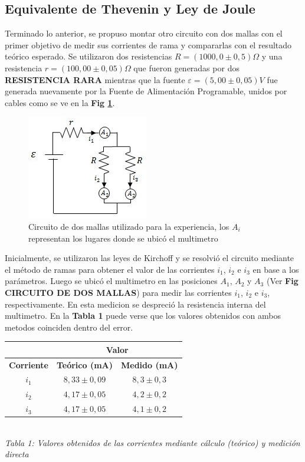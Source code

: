 \documentclass[11pt,a4paper]{article}
\begin{document}
\subsection{Equivalente de Thevenin y Ley de Joule}

Terminado lo anterior, se propuso montar otro circuito con dos mallas con el primer objetivo de medir sus corrientes de rama y compararlas con el resultado teórico esperado. Se utilizaron dos resistencias $R = (1000,0\pm0,5)\Omega$ y una resistencia $r = (100,00\pm0,05)\Omega$ que fueron generadas por dos \textbf{RESISTENCIA RARA} mientras que la fuente $\varepsilon = (5,00\pm0,05)V$ fue generada nuevamente por la Fuente de Alimentación Programable, unidos por cables como se ve en la \textbf{Fig \ref{fig:circ_mallas}}.

\begin{figure}[h]
  \centering
  \includegraphics[scale=1]{Mallas_sin_carga}
  \caption{Circuito de dos mallas utilizado para la experiencia, los $A_i$ representan los lugares donde se ubicó el multimetro}
  \label{fig:circ_mallas}
\end{figure}

 Inicialmente, se utilizaron las leyes de Kirchoff y se resolvió el circuito mediante el método de ramas para obtener el valor de las corrientes $i_1$, $i_2$ e $i_3$ en base a los parámetros. Luego se ubicó el multimetro en las posiciones $A_1$, $A_2$ y $A_3$ (Ver \textbf{Fig CIRCUITO DE DOS MALLAS})  para medir las corrientes $i_1$, $i_2$ e $i_3$, respectivamente. En esta medicion se despreció la resistencia interna del multimetro. En la \textbf{Tabla 1} puede verse que los valores obtenidos con ambos metodos coinciden dentro del error. 

\begin{center}
\begin{tabular}{||c|c|c||}
\hline
 & \multicolumn{2}{c||}{\textbf{Valor}} \\ \hline
\textbf{Corriente} & \textbf{Teórico (mA)} & \textbf{Medido (mA)} \\ \hline 
$i_1$ & $8,33\pm0,09$ & $8,3\pm0,3$ \\ \hline 
$i_2$ & $4,17\pm0,05$ & $4,2\pm0,2$ \\ \hline 
$i_3$ & $4,17\pm0,05$ & $4,1\pm0,2$ \\ \hline 
\end{tabular}\\

\textit{Tabla 1: Valores obtenidos de las corrientes mediante cálculo (teórico) y medición directa}
\end{center}
\end{document}
